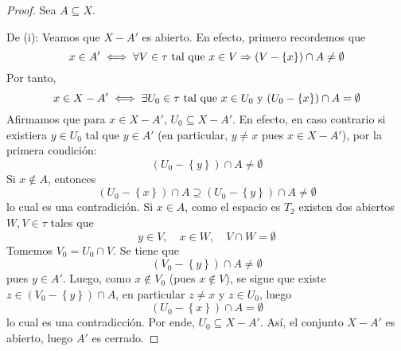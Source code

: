 \documentclass[12pt]{report}
\theoremstyle{largebreak}
\begin{document}
    \begin{proof}
        Sea $A\subseteq X$.
        
        De (i): Veamos que $X-A'$ es abierto. En efecto, primero recordemos que
        \begin{equation*}
            x\in A'\iff \forall V\in\tau\textup{ tal que }x\in V\Rightarrow (V-\left\{x\right\})\cap A\neq\emptyset
        \end{equation*}
        Por tanto,
        \begin{equation*}
            x\in X-A'\iff \exists U_0\in\tau \textup{ tal que }x\in U_0\textup{ y }(U_0-\left\{x\right\})\cap A=\emptyset
        \end{equation*}
        Afirmamos que para $x\in X-A'$, $U_0\subseteq X-A'$. En efecto, en caso contrario si existiera $y\in U_0$ tal que $y\in A'$ (en particular, $y\neq x$ pues $x\in X-A'$), por la primera condición:
        \begin{equation*}
            (U_0-\left\{y\right\})\cap A\neq\emptyset
        \end{equation*}
        Si $x\notin A$, entonces
        \begin{equation*}
            (U_0-\left\{x\right\})\cap A\supseteq(U_0-\left\{y\right\})\cap A\neq\emptyset 
        \end{equation*}
        lo cual es una contradición. Si $x\in A$, como el espacio es $T_2$ existen dos abiertos $W,V\in\tau$ tales que
        \begin{equation*}
            y\in V,\quad x\in W,\quad V\cap W=\emptyset
        \end{equation*}
        Tomemos $V_0=U_0\cap V$. Se tiene que
        \begin{equation*}
            (V_0-\left\{y\right\})\cap A\neq\emptyset
        \end{equation*}
        pues $y\in A'$. Luego, como $x\notin V_0$ (pues $x\notin V$), se sigue que existe $z\in (V_0-\left\{y\right\})\cap A$, en particular $z\neq x$ y $z\in U_0$, luego
        \begin{equation*}
            (U_0-\left\{x\right\})\cap A=\emptyset
        \end{equation*}
        lo cual es una contradicción. Por ende, $U_0\subseteq X-A'$. Así, el conjunto $X-A'$ es abierto, luego $A'$ es cerrado.


\end{proof}
\end{document}
